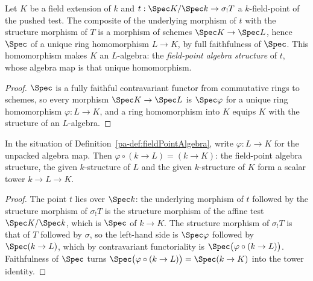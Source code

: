 \begin{definition}
  \label{pa-def:fieldPointAlgebra}
  \leanok

  Let \(K\) be a field extension of \(k\) and
  \(t : \Spec K/\Spec k \to \sigma_{!}T\) a \(k\)-field-point of the pushed test. The
  composite of the underlying morphism of \(t\) with the structure morphism of \(T\)
  is a morphism of schemes \(\Spec K \to \Spec L\), hence \(\Spec\) of a unique ring
  homomorphism \(L \to K\), by full faithfulness of \(\Spec\). This homomorphism makes
  \(K\) an \(L\)-algebra: the \emph{field-point algebra structure} of \(t\), whose
  algebra map is that unique homomorphism.
\end{definition}
\begin{proof}
  \leanok
  \(\Spec\) is a fully faithful contravariant functor from commutative rings to
  schemes, so every morphism \(\Spec K \to \Spec L\) is \(\Spec\varphi\) for a unique
  ring homomorphism \(\varphi : L \to K\), and a ring homomorphism into \(K\) equips
  \(K\) with the structure of an \(L\)-algebra.
\end{proof}

\begin{lemma}
  \label{pa-lem:isScalarTower_fieldPointAlgebra}
  \leanok

  In the situation of Definition~\ref{pa-def:fieldPointAlgebra}, write
  \(\varphi : L \to K\) for the unpacked algebra map. Then
  \(\varphi \circ (k \to L) = (k \to K)\): the field-point algebra structure, the
  given \(k\)-structure of \(L\) and the given \(k\)-structure of \(K\) form a scalar
  tower \(k \to L \to K\).
\end{lemma}
\begin{proof}
  \leanok
  The point \(t\) lies over \(\Spec k\): the underlying morphism of \(t\) followed by
  the structure morphism of \(\sigma_{!}T\) is the structure morphism of the affine
  test \(\Spec K/\Spec k\), which is \(\Spec\) of \(k \to K\). The structure morphism
  of \(\sigma_{!}T\) is that of \(T\) followed by \(\sigma\), so the left-hand side is
  \(\Spec\varphi\) followed by \(\Spec(k \to L)\), which by contravariant
  functoriality is \(\Spec\bigl(\varphi \circ (k \to L)\bigr)\). Faithfulness of
  \(\Spec\) turns \(\Spec\bigl(\varphi \circ (k \to L)\bigr) = \Spec(k \to K)\) into
  the tower identity.
\end{proof}

